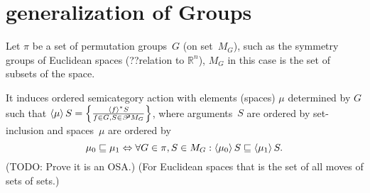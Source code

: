 \chapter{generalization of Groups}

Let $\pi$ be a set of permutation groups~$G$ (on set~$M_G$), such as the symmetry groups of Euclidean spaces
(??relation to $\mathbb{R}^n$), $M_G$ in this case is the set of subsets of the space.

It induces ordered semicategory action with elements (spaces) $\mu$ determined by $G$ such that
$\left\langle \mu\right\rangle S=\left\{ \frac{\left\langle f\right\rangle ^{\ast}S}{f\in G,S\in\mathscr{P} M_G}\right\}$, where arguments~$S$ are ordered by set-inclusion
and spaces~$\mu$ are ordered by
\[ \mu_0\sqsubseteq\mu_1\Leftrightarrow\forall G\in\pi, S\in M_G:\left\langle \mu_0\right\rangle S\sqsubseteq\left\langle \mu_1\right\rangle S. \]
(TODO: Prove it is an OSA.)
(For Euclidean spaces that is the set of all moves of sets of sets.)
